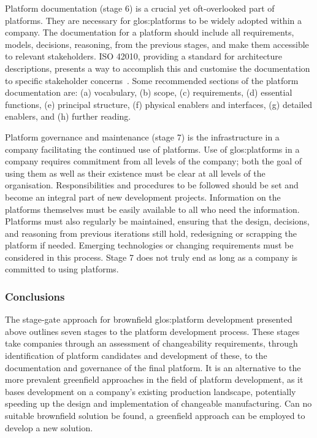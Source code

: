 Platform documentation (stage 6) is a crucial yet oft-overlooked part of platforms.
They are necessary for \gls{glos:platform}s to be widely adopted within a company.
The documentation for a platform should include all requirements, models, decisions, reasoning, \etc{} from the previous stages, and make them accessible to relevant stakeholders.
ISO 42010, providing a standard for architecture descriptions, presents a way to accomplish this and customise the documentation to specific stakeholder concerns~\parencite{ISO42010}.
Some recommended sections of the platform documentation are: (a) vocabulary, (b) scope, (c) requirements, (d) essential functions, (e) principal structure, (f) physical enablers and interfaces, (g) detailed enablers, and (h) further reading.

Platform governance and maintenance (stage 7) is the infrastructure in a company facilitating the continued use of platforms. 
Use of \gls{glos:platform}s in a company requires commitment from all levels of the company; both the goal of using them as well as their existence must be clear at all levels of the organisation.
Responsibilities and procedures to be followed should be set and become an integral part of new development projects.
Information on the platforms themselves must be easily available to all who need the information.
Platforms must also regularly be maintained, ensuring that the design, decisions, and reasoning from previous iterations still hold, redesigning or scrapping the platform if needed.
Emerging technologies or changing requirements must be considered in this process.
Stage 7 does not truly end as long as a company is committed to using platforms.

\subsubsection*{Conclusions}
The stage-gate approach for brownfield \gls{glos:platform} development presented above outlines seven stages to the platform development process.
These stages take companies through an assessment of changeability requirements, through identification of platform candidates and development of these, to the documentation and governance of the final platform.
It is an alternative to the more prevalent greenfield approaches in the field of platform development, as it bases development on a company's existing production landscape, potentially speeding up the design and implementation of changeable manufacturing.
Can no suitable brownfield solution be found, a greenfield approach can be employed to develop a new solution.

